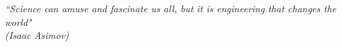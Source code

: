 \begin{epigrafe}
    \vspace*{\fill}
	\begin{flushright}
		\textit{``Science can amuse and fascinate us all, but it is engineering that changes the world" \\
        (Isaac Asimov)}
	\end{flushright}
\end{epigrafe}